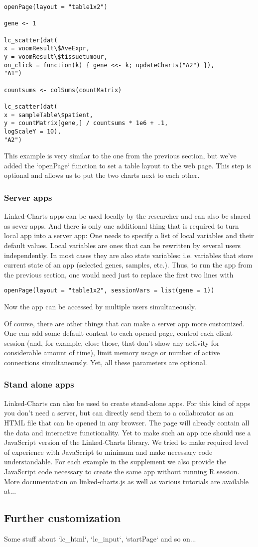 \documentclass[twocolumn,10pt]{article}
\begin{document}
\begin{verbatim}
openPage(layout = "table1x2")

gene <- 1

lc_scatter(dat(
x = voomResult\$AveExpr,
y = voomResult\$tissuetumour,
on_click = function(k) { gene <<- k; updateCharts("A2") }),
"A1")

countsums <- colSums(countMatrix)

lc_scatter(dat(
x = sampleTable\$patient,
y = countMatrix[gene,] / countsums * 1e6 + .1,
logScaleY = 10),
"A2")
\end{verbatim}

This example is very similar to the one from the previous section, but we've added the `openPage` function to set a table layout to the web page. This step is optional and allows us to put the two charts next to each other.

\subsubsection{Server apps}
Linked-Charts apps can be used locally by the researcher and can also be shared as sever apps. And there is only one additional thing that is required to turn local app into a server app: One needs to specify a list of local variables and their default values. Local variables are ones that can be rewritten by several users independently. In most cases they are also state variables: i.e. variables that store current state of an app (selected genes, samples, etc.). Thus, to run the app from the previous section, one would need just to replace the first two lines with
\begin{verbatim}
openPage(layout = "table1x2", sessionVars = list(gene = 1))
\end{verbatim}

Now the app can be accessed by multiple users simultaneously.

Of course, there are other things that can make a server app more customized. One can add some default content to each opened page, control each client session (and, for example, close those, that don't show any activity for considerable amount of time), limit memory usage or number of active connections simultaneously. Yet, all these parameters are optional.

\subsubsection{Stand alone apps}
Linked-Charts can also be used to create stand-alone apps. For this kind of apps you don't need a server, but can directly send them to a collaborator as an HTML file that can be opened in any browser. The page will already contain all the data and interactive functionality. Yet to make such an app one should use a JavaScript version of the Linked-Charts library. We tried to make required level of experience with JavaScript to minimum and make necessary code understandable. For each example in the supplement we also provide the JavaScript code necessary to create the same app without running R session. More documentation on linked-charts.js as well as various tutorials are available at...

\subsection{Further customization}
Some stuff about `lc_html`, `lc_input`, `startPage` and so on...
\end{document}
